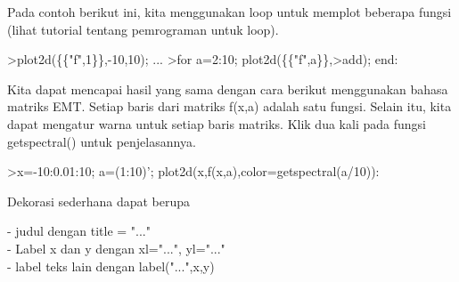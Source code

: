 \documentclass{article}
\begin{document}
\begin{eulernotebook}
\begin{eulercomment}
\begin{eulercomment}
\begin{eulercomment}
\begin{eulercomment}
\begin{eulercomment}
\begin{eulercomment}
\begin{eulercomment}
\begin{eulercomment}
\begin{eulercomment}
Pada contoh berikut ini, kita menggunakan loop untuk memplot beberapa
fungsi (lihat tutorial tentang pemrograman untuk loop).
\end{eulercomment}
\begin{eulerprompt}
>plot2d(\{\{"f",1\}\},-10,10); ...
>for a=2:10; plot2d(\{\{"f",a\}\},>add); end:
\end{eulerprompt}
\begin{eulercomment}
Kita dapat mencapai hasil yang sama dengan cara berikut menggunakan
bahasa matriks EMT. Setiap baris dari matriks f(x,a) adalah satu
fungsi. Selain itu, kita dapat mengatur warna untuk setiap baris
matriks. Klik dua kali pada fungsi getspectral() untuk penjelasannya.
\end{eulercomment}
\begin{eulerprompt}
>x=-10:0.01:10; a=(1:10)'; plot2d(x,f(x,a),color=getspectral(a/10)):
\end{eulerprompt}
\begin{eulercomment}
Dekorasi sederhana dapat berupa

- judul dengan title = "..."\\
- Label x dan y dengan xl="...", yl="..."\\
- label teks lain dengan label("...",x,y)


\end{eulercomment}
\end{eulercomment}
\end{eulercomment}
\end{eulercomment}
\end{eulercomment}
\end{eulercomment}
\end{eulercomment}
\end{eulercomment}
\end{eulercomment}
\end{eulernotebook}
\end{document}
